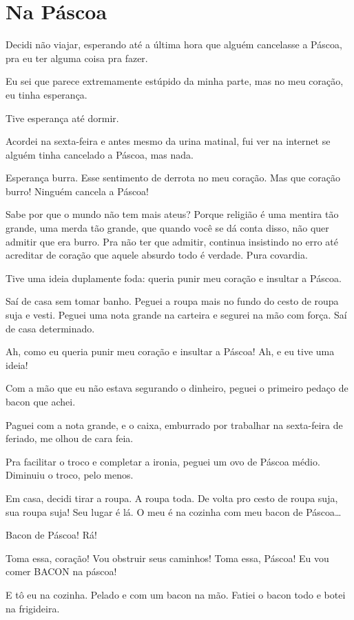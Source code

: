 \chapter{Na Páscoa}

Decidi não viajar, esperando até a última hora que alguém cancelasse a Páscoa, pra eu ter alguma coisa pra fazer.

Eu sei que parece extremamente estúpido da minha parte, mas no meu coração, eu tinha esperança.

Tive esperança até dormir.

Acordei na sexta-feira e antes mesmo da urina matinal, fui ver na internet se alguém tinha cancelado a Páscoa, mas nada.

Esperança burra. Esse sentimento de derrota no meu coração. Mas que coração burro! Ninguém cancela a Páscoa!

Sabe por que o mundo não tem mais ateus? Porque religião é uma mentira tão grande, uma merda tão grande, que quando você se dá conta disso, não quer admitir que era burro. Pra não ter que admitir, continua insistindo no erro até acreditar de coração que aquele absurdo todo é verdade. Pura covardia.

Tive uma ideia duplamente foda: queria punir meu coração e insultar a Páscoa.

Saí de casa sem tomar banho. Peguei a roupa mais no fundo do cesto de roupa suja e vesti. Peguei uma nota grande na carteira e segurei na mão com força. Saí de casa determinado.

Ah, como eu queria punir meu coração e insultar a Páscoa! Ah, e eu tive uma ideia!

Com a mão que eu não estava segurando o dinheiro, peguei o primeiro pedaço de bacon que achei.

Paguei com a nota grande, e o caixa, emburrado por trabalhar na sexta-feira de feriado, me olhou de cara feia.

Pra facilitar o troco e completar a ironia, peguei um ovo de Páscoa médio. Diminuiu o troco, pelo menos.

Em casa, decidi tirar a roupa. A roupa toda. De volta pro cesto de roupa suja, sua roupa suja! Seu lugar é lá. O meu é na cozinha com meu bacon de Páscoa\ldots

Bacon de Páscoa! Rá!

Toma essa, coração! Vou obstruir seus caminhos! Toma essa, Páscoa! Eu vou comer BACON na páscoa!

E tô eu na cozinha. Pelado e com um bacon na mão. Fatiei o bacon todo e botei na frigideira.

